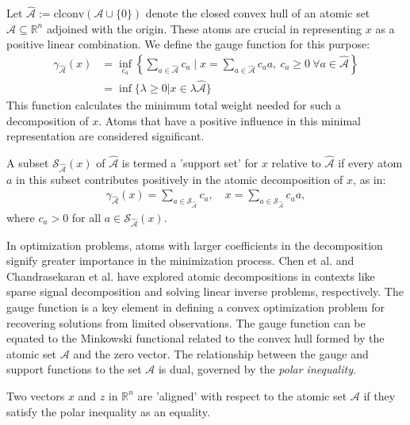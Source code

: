 \documentclass[10pt, twocolumn, reqno, a4paper,oneside]{amsart}
\numberwithin{equation}{section}
\numberwithin{theorem}{section}
\numberwithin{figure}{section}
\numberwithin{table}{section}
\numberwithin{theorem}{section}
\numberwithin{equation}{section}
\begin{document}
Let $\hat{\mathcal{A}}:=\mathrm{clconv}(\mathcal{A} \cup \{0\})$ denote the closed convex hull of an atomic set $\mathcal{A} \subseteq \mathbb{R}^n$ adjoined with the origin.
These atoms are crucial in representing $x$ as a positive linear combination. We define the gauge function for this purpose:
\begin{equation*}
	\begin{aligned}
		\mathcal{\gamma}_{\hat{\mathcal{A}}}(x) &= \inf_{c_a}\left\{ \sum_{a \in \hat{\mathcal{A}}} c_a \mid x = \sum_{a \in \hat{\mathcal{A}}} c_a a, \ c_a \geq 0 \ \forall a \in \hat{\mathcal{A}} \right\} \\
		&= \inf \{\lambda \geq 0 | x \in \lambda \hat{\mathcal{A}}\}
	\end{aligned}
\end{equation*}
This function calculates the minimum total weight needed for such a decomposition of $x$. Atoms that have a positive influence in this minimal representation are considered significant.

\begin{definition}
A subset $\mathcal{S}_{\hat{\mathcal{A}}}(x)$ of $\hat{\mathcal{A}}$ is termed a 'support set' for $x$ relative to $\hat{\mathcal{A}}$ if every atom $a$ in this subset contributes positively in the atomic decomposition of $x$, as in:
\begin{align*}
	\gamma_{\hat{\mathcal{A}}} (x) = \sum_{a \in \mathcal{S}_{\hat{\mathcal{A}}}} c_a, \quad
	x = \sum_{a \in \mathcal{S}_{\hat{\mathcal{A}}}} c_a a,
\end{align*}
where $c_a > 0$ for all $a \in \mathcal{S}_{\hat{\mathcal{A}}}(x)$.
\end{definition}

In optimization problems, atoms with larger coefficients in the decomposition signify greater importance in the minimization process.
Chen et al. and Chandrasekaran et al. have explored atomic decompositions in contexts like sparse signal decomposition and solving linear inverse problems, respectively. The gauge function is a key element in defining a convex optimization problem for recovering solutions from limited observations.
The gauge function can be equated to the Minkowski functional related to the convex hull formed by the atomic set $\mathcal{A}$ and the zero vector. The relationship between the gauge and support functions to the set $\mathcal{A}$ is dual, governed by the \textit{polar inequality}.

\begin{definition}[Alignment]
	Two vectors $x$ and $z$ in $\mathbb{R}^n$ are 'aligned' with respect to the atomic set $\mathcal{A}$ if they satisfy the polar inequality as an equality.
\end{definition}
\end{document}

